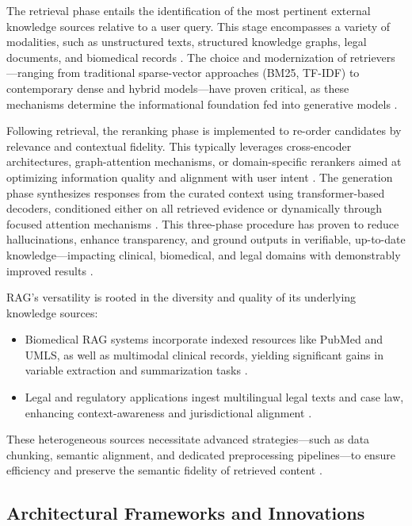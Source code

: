 The retrieval phase entails the identification of the most pertinent external knowledge sources relative to a user query. This stage encompasses a variety of modalities, such as unstructured texts, structured knowledge graphs, legal documents, and biomedical records \cite{ref42, ref49, ref51, ref52, ref54, ref55, ref63}. The choice and modernization of retrievers—ranging from traditional sparse-vector approaches (BM25, TF-IDF) to contemporary dense and hybrid models—have proven critical, as these mechanisms determine the informational foundation fed into generative models \cite{ref10, ref35, ref52, ref54}.

Following retrieval, the reranking phase is implemented to re-order candidates by relevance and contextual fidelity. This typically leverages cross-encoder architectures, graph-attention mechanisms, or domain-specific rerankers aimed at optimizing information quality and alignment with user intent \cite{ref4, ref36, ref37}. The generation phase synthesizes responses from the curated context using transformer-based decoders, conditioned either on all retrieved evidence or dynamically through focused attention mechanisms \cite{ref5, ref16, ref17, ref37}. This three-phase procedure has proven to reduce hallucinations, enhance transparency, and ground outputs in verifiable, up-to-date knowledge—impacting clinical, biomedical, and legal domains with demonstrably improved results \cite{ref64}.

RAG’s versatility is rooted in the diversity and quality of its underlying knowledge sources:

\begin{itemize}
    \item Biomedical RAG systems incorporate indexed resources like PubMed and UMLS, as well as multimodal clinical records, yielding significant gains in variable extraction and summarization tasks \cite{ref42, ref52, ref54, ref55, ref63}.
    \item Legal and regulatory applications ingest multilingual legal texts and case law, enhancing context-awareness and jurisdictional alignment \cite{ref49, ref51, ref63}.
\end{itemize}

These heterogeneous sources necessitate advanced strategies—such as data chunking, semantic alignment, and dedicated preprocessing pipelines—to ensure efficiency and preserve the semantic fidelity of retrieved content \cite{ref52, ref54}.

\subsection{Architectural Frameworks and Innovations}

